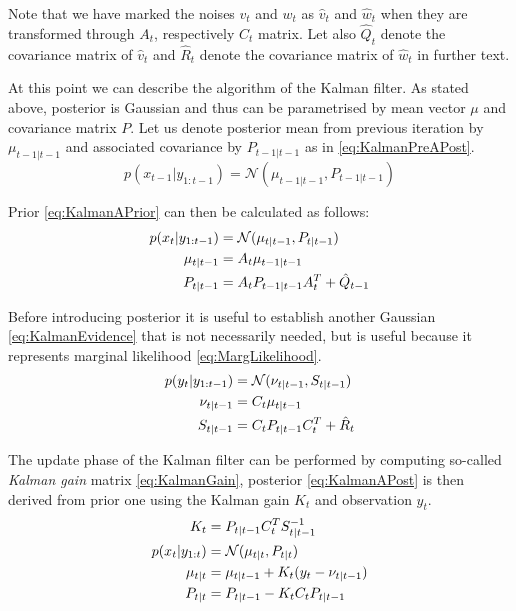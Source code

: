 Note that we have marked the noises \(v_t\) and \(w_t\) as \(\hat{v}_t\) and \(\hat{w}_t\) when they
are transformed through \(A_t\), respectively \(C_t\) matrix. Let also \(\hat{Q}_t\) denote the
covariance matrix of \(\hat{v}_t\) and \(\hat{R}_t\) denote the covariance matrix of \(\hat{w}_t\)
in further text.

At this point we can describe the algorithm of the Kalman filter. As stated above, posterior {\pdf}
is Gaussian and thus can be parametrised by mean vector \(\mu\) and covariance matrix \(P\). Let us
denote posterior mean from previous iteration by \(\mu_{t-1|t-1}\) and associated covariance by
\(P_{t-1|t-1}\) as in \eqref{eq:KalmanPreAPost}.
\begin{equation} \label{eq:KalmanPreAPost}
	p(x_{t-1} | y_{1:t-1}) = \mathcal{N}(\mu_{t-1|t-1}, P_{t-1|t-1})
\end{equation}

Prior {\pdf} \eqref{eq:KalmanAPrior} can then be calculated as follows:~\cite{AruMasGor:02}
\begin{align}
	p(x_t | y_{1:t-1}) &= \mathcal{N}(\mu_{t|t-1}, P_{t|t-1}) \label{eq:KalmanAPrior} \\
	\mu_{t|t-1} &= A_t \mu_{t-1|t-1} \notag \\
	P_{t|t-1} &= A_t P_{t-1|t-1} A_t^T + \hat{Q}_{t-1} \notag
\end{align}

Before introducing posterior {\pdf} it is useful to establish another Gaussian {\pdf}
\eqref{eq:KalmanEvidence} that is not necessarily needed, but is useful because it represents
marginal likelihood \eqref{eq:MargLikelihood}. %
\begin{align}
	p(y_t|y_{1:t-1}) &= \mathcal{N}(\nu_{t|t-1}, S_{t|t-1}) \label{eq:KalmanEvidence} \\
	\nu_{t|t-1} &= C_t \mu_{t|t-1} \notag \\
	S_{t|t-1} &= C_t P_{t|t-1} C_t^T + \hat{R}_t \notag
\end{align}

The update phase of the Kalman filter can be performed by computing so-called \emph{Kalman gain} matrix
\eqref{eq:KalmanGain}, posterior {\pdf} \eqref{eq:KalmanAPost} is then derived from prior one
using the Kalman gain \(K_t\) and observation \(y_t\).~\cite{AruMasGor:02}
\begin{align}
	K_t &= P_{t|t-1} C_t^T S_{t|t-1}^{-1} \label{eq:KalmanGain} \\[\parskip]
	p(x_t|y_{1:t}) &= \mathcal{N}(\mu_{t|t}, P_{t|t}) \label{eq:KalmanAPost} \\
	\mu_{t|t} &= \mu_{t|t-1} + K_t(y_t - \nu_{t|t-1}) \notag \\
	P_{t|t} &= P_{t|t-1} - K_t C_t P_{t|t-1} \notag
\end{align}

